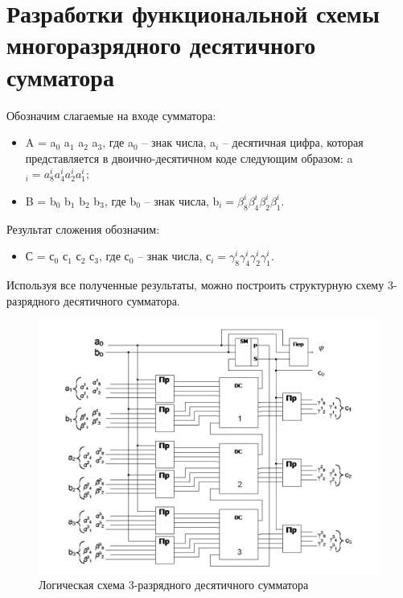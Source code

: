 \documentclass[a4paper,14pt]{article}
\begin{document}
\section{Разработки функциональной схемы многоразрядного десятичного сумматора}

Обозначим слагаемые на входе сумматора:

\begin{itemize}	
	\item A = a$_0$ a$_1$ a$_2$ a$_3$, где a$_0$ -- знак числа, a$_i$ -- десятичная цифра, которая представляется в двоично-десятичном коде следующим образом:
	a$_i = a^i_8 a^i_4 a^i_2 a^i_1$;
	
	\item B = b$_0$ b$_1$ b$_2$ b$_3$, где b$_0$ -- знак числа, b$_i = \beta^i_8 \beta^i_4 \beta^i_2 \beta^i_1$.	
\end{itemize}

Результат сложения обозначим:
\begin{itemize}	
	\item С = с$_0$ с$_1$ с$_2$ с$_3$, где с$_0$ -- знак числа, с$_i = \gamma^i_8 \gamma^i_4 \gamma^i_2 \gamma^i_1$.	
\end{itemize}

Используя все полученные результаты, можно построить структурную схему 3-разрядного десятичного сумматора.

\begin{figure}[H]
	\centering
	\includegraphics[width=\linewidth]{schemas/3Sum}
	\caption{Логическая схема 3-разрядного десятичного сумматора}
	\label{fig:3razrSum}
\end{figure}
\end{document}
